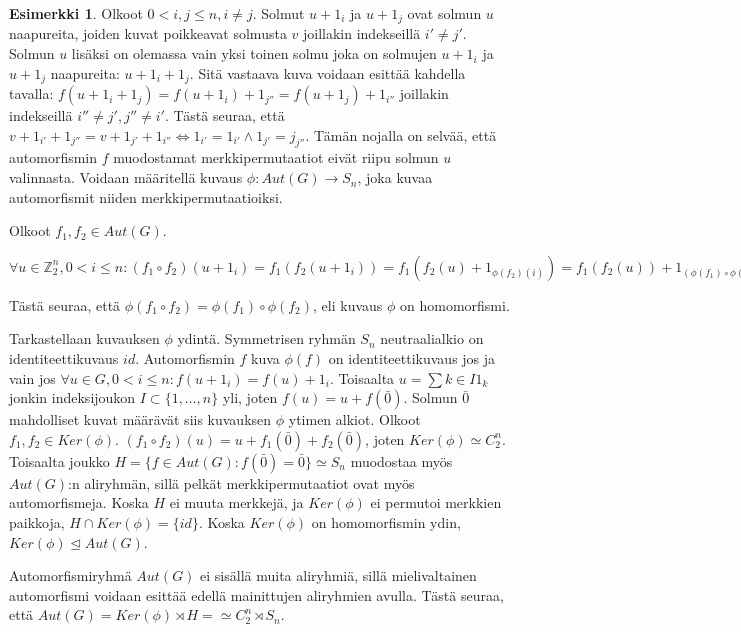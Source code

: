 \documentclass[a4paper, 12pt]{article}
\theoremstyle{definition}
\newtheorem{example}[mydef]{Esimerkki}
\theoremstyle{plain}
\begin{document}
\begin{example}
Olkoot $0 < i, j \leq n, i \neq j$. Solmut $u + 1_i$ ja $u+ 1_j$ ovat solmun $u$ naapureita, joiden kuvat poikkeavat solmusta $v$ joillakin indekseillä $i' \neq j'$. Solmun $u$ lisäksi on olemassa vain yksi toinen solmu joka on solmujen $u + 1_i$ ja $u + 1_j$ naapureita: $u + 1_i + 1_j$. Sitä vastaava kuva voidaan esittää kahdella tavalla: $f(u + 1_i + 1_j) = f(u + 1_i) + 1_{j''} = f(u + 1_j) + 1_{i''}$ joillakin indekseillä $i'' \neq j', j'' \neq i'$. Tästä seuraa, että $v + 1_{i'} + 1_{j''} = v + 1_{j'} + 1_{i''} \Leftrightarrow 1_{i'} = 1_{i'} \wedge 1_{j'} = j_{j''}$. Tämän nojalla on selvää, että  automorfismin $f$ muodostamat merkkipermutaatiot eivät riipu solmun $u$ valinnasta. Voidaan määritellä kuvaus ${\phi: Aut(G) \rightarrow S_n}$, joka kuvaa automorfismit niiden merkkipermutaatioiksi.

Olkoot $f_1, f_2 \in Aut(G)$. 
\begin{center}
\begin{math}
\forall u \in \mathbb{Z}_2^n, 0 < i \leq n: (f_1 \circ f_2)(u + 1_i) = f_1(f_2(u + 1_i))
= f_1(f_2(u) + 1_{\phi(f_2)(i)}) = f_1(f_2(u)) + 1_{(\phi(f_1) \circ \phi(f_2))(i)}
\end{math}
\end{center}
Tästä seuraa, että $\phi(f_1 \circ f_2) = \phi(f_1) \circ \phi(f_2)$, eli kuvaus $\phi$ on homomorfismi.

Tarkastellaan kuvauksen $\phi$ ydintä. Symmetrisen ryhmän $S_n$ neutraalialkio on identiteettikuvaus $id$. Automorfismin $f$ kuva $\phi(f)$ on identiteettikuvaus jos ja vain jos $ \forall u \in G, 0 < i \leq n: f(u + 1_i) = f(u) + 1_i$. Toisaalta $u = \sum{k \in I} 1_k$ jonkin indeksijoukon $I \subset \{1, \dots , n\}$ yli, joten $f(u) = u + f(\bar{0})$. Solmun $\bar{0}$ mahdolliset kuvat määrävät siis kuvauksen $\phi$ ytimen alkiot. Olkoot $f_1, f_2 \in Ker(\phi)$. $(f_1 \circ f_2)(u) = u + f_1(\bar{0}) + f_2(\bar{0})$, joten $Ker(\phi) \simeq C_2^n$. Toisaalta joukko $H = \{f \in Aut(G) : f(\bar{0}) = \bar{0}\} \simeq S_n$ muodostaa myös $Aut(G)$:n aliryhmän, sillä pelkät merkkipermutaatiot ovat myös automorfismeja. Koska $H$ ei muuta merkkejä, ja $Ker(\phi)$ ei permutoi merkkien paikkoja, $H \cap Ker(\phi) = \{ id \}$. Koska $Ker(\phi)$ on homomorfismin ydin, $Ker(\phi) \trianglelefteq Aut(G)$.

Automorfismiryhmä $Aut(G)$ ei sisällä muita aliryhmiä, sillä mielivaltainen automorfismi voidaan esittää edellä mainittujen aliryhmien avulla. Tästä seuraa, että $Aut(G) = Ker(\phi) \rtimes H = \simeq C_2^n \rtimes S_n$.
\end{example}
\end{document}
